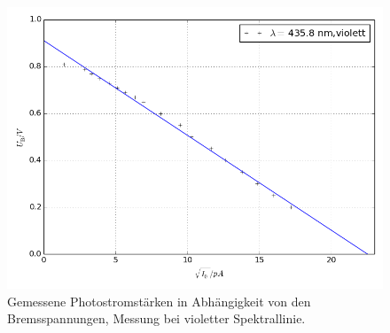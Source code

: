 \begin{figure}[p]
	\centering
	\includegraphics[width=\textwidth]{Bilder/Fit_violett.png}
	\caption{Gemessene Photostromstärken in Abhängigkeit von den Bremsspannungen, Messung bei violetter Spektrallinie.}
	\label{fig:uidiagramm2}
\end{figure}
